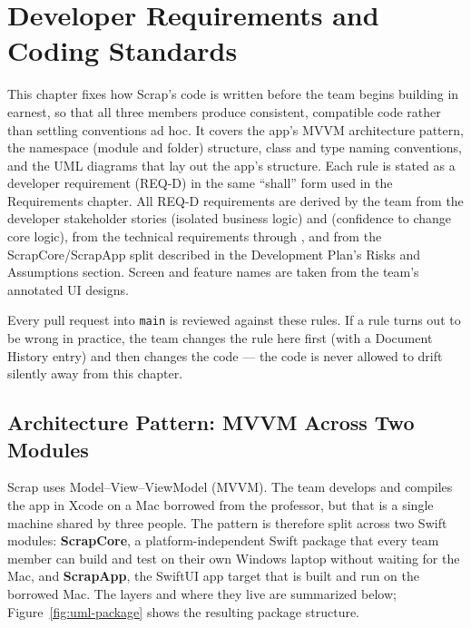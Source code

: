 \chapter{Developer Requirements and Coding Standards}
\begingroup\sloppy

\noindent This chapter fixes how Scrap's code is written before the team begins building in earnest, so that all three members produce consistent, compatible code rather than settling conventions ad hoc. It covers the app's MVVM architecture pattern, the namespace (module and folder) structure, class and type naming conventions, and the UML diagrams that lay out the app's structure. Each rule is stated as a developer requirement (REQ-D) in the same ``shall'' form used in the Requirements chapter. All REQ-D requirements are derived by the team from the developer stakeholder stories  (isolated business logic) and  (confidence to change core logic), from the technical requirements  through , and from the ScrapCore/ScrapApp split described in the Development Plan's Risks and Assumptions section. Screen and feature names are taken from the team's annotated UI designs.

\begin{dsnNote}
Every pull request into \texttt{main} is reviewed against these rules. If a rule turns out to be wrong in practice, the team changes the rule here first (with a Document History entry) and then changes the code --- the code is never allowed to drift silently away from this chapter.
\end{dsnNote}

\section{Architecture Pattern: MVVM Across Two Modules}

Scrap uses Model--View--ViewModel (MVVM). The team develops and compiles the app in Xcode on a Mac borrowed from the professor, but that is a single machine shared by three people. The pattern is therefore split across two Swift modules: \textbf{ScrapCore}, a platform-independent Swift package that every team member can build and test on their own Windows laptop without waiting for the Mac, and \textbf{ScrapApp}, the SwiftUI app target that is built and run on the borrowed Mac. The layers and where they live are summarized below; Figure~\ref{fig:uml-package} shows the resulting package structure.

